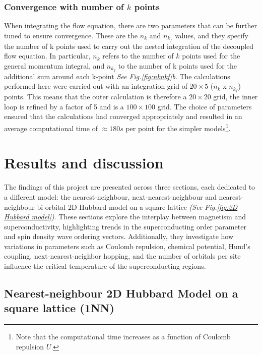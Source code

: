 \documentclass[11pt]{article}
\begin{document}
\subsubsection{Convergence with number of $k$ points }

When integrating the flow equation, there are two parameters that can be further tuned to ensure convergence.
These are the $n_k$ and $n_{k_f}$ values, and they specify the number of k points used to carry out the nested integration of the decoupled flow equation. 
In particular, $n_k$ refers to the number of $k$ points used for the general momentum integral, and $n_{k_f}$ to the number of k points used for 
the additional sum around each k-point \textit{See Fig.\ref{fig:nknkf}b}. The calculations performed here were carried out with an integration 
grid of $20 \times 5$ ($n_k$ x $n_{k_f}$) points. This means that the outer calculation is therefore a $20\times20$ grid, the inner loop is refined by a factor
of 5 and is a $100 \times 100$ grid. The choice of parameters ensured that the calculations had converged appropriately 
and resulted in an average computational time of $\approx 180s$ per point for the simpler models\footnote{Note that the computational time increases as a function of Coulomb repulsion $U$. }. 


\section{Results and discussion}

The findings of this project are presented across three sections, each dedicated to 
a different model: the nearest-neighbour, next-nearest-neighbour and nearest-neighbour
bi-orbital 2D Hubbard model on a square lattice \textit{(See Fig.\ref{fig:2D Hubbard model})}. 
These sections explore the interplay between magnetism and superconductivity, 
highlighting trends in the superconducting order parameter and spin density wave
ordering vectors. Additionally, they investigate how variations in parameters such as 
Coulomb repulsion, chemical potential, Hund's coupling, next-nearest-neighbor hopping, and the number of orbitals per site 
influence the critical temperature of the superconducting regions.

\subsection{Nearest-neighbour 2D Hubbard Model on a square lattice (1NN)}
\label{subsec:1NNModel}
\end{document}
